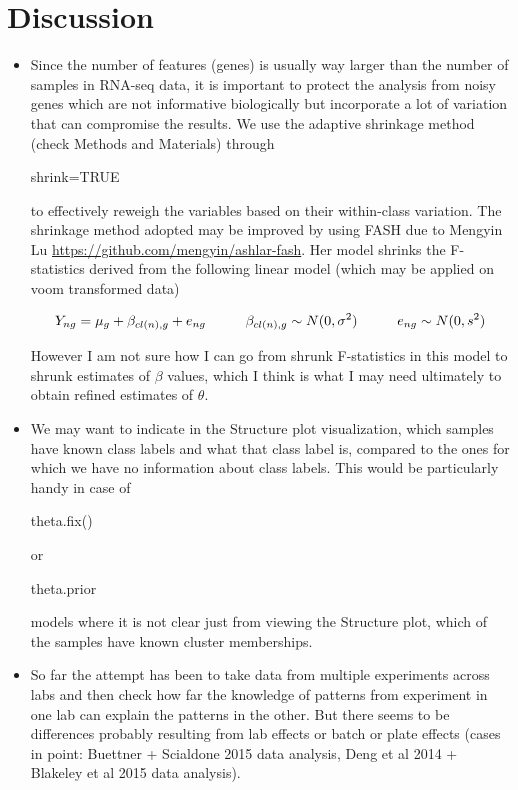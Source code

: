 \documentclass[12pt]{article}\usepackage[]{graphicx}\usepackage[usenames,dvipsnames]{color}
\begin{document}
\section{Discussion}

\begin{itemize}

\item Since the number of features (genes) is usually way larger than the number of samples in RNA-seq data, it is important to protect the analysis from noisy genes which are not informative biologically but incorporate a lot of variation that can compromise the results. We use the adaptive shrinkage method (check Methods and Materials) through \begin{verb} shrink=TRUE \end{verb} to effectively reweigh the variables based on their within-class variation. The shrinkage method adopted may be improved by using FASH due to Mengyin Lu \url{https://github.com/mengyin/ashlar-fash}. Her model shrinks the F-statistics derived from the following linear model (which may be applied on voom transformed data)

\begin{equation}
Y_{ng}=\mu_{g}+\beta_{cl(n),g}+e_{ng} \hspace{1 cm} \beta_{cl(n),g} \sim N(0, \sigma^2) \hspace{1 cm} e_{ng} \sim N(0, s^2)
\end{equation}

However I am not sure how I can go from shrunk F-statistics in this model to shrunk estimates 
of $\beta$ values, which I think is what I may need ultimately to obtain refined estimates of $\theta$.

\item We may want to indicate in the Structure plot visualization, which samples have known class labels and what that class label is, compared to the ones for which we have no information about class labels. This would be particularly handy in case of \begin{verb} theta.fix() \end{verb} or \begin{verb} theta.prior \end{verb} models where it is not clear just from viewing the Structure plot, which of the samples have known cluster memberships.

\item So far the attempt has been to take data from multiple experiments across labs and then check how far the knowledge of patterns from experiment in one lab can explain the patterns in the other. But there seems to be differences probably resulting from lab effects or batch or plate effects (cases in point: Buettner + Scialdone 2015 data analysis, Deng et al 2014 + Blakeley et al 2015 data analysis).


\end{itemize}
\end{document}

